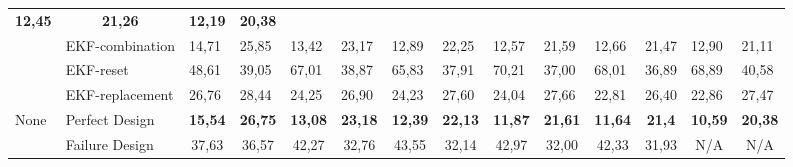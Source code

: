 \begin{table*}[]
\begin{tabular}{@{}llllllllllllll@{}}
		\multicolumn{1}{c|}{\textbf{12,45}} &
		\multicolumn{1}{c|}{\textbf{21,26}} &
		\multicolumn{1}{c|}{\textbf{12,19}} &
		\multicolumn{1}{c|}{\textbf{20,38}} \\ \cmidrule(l){2-14} 
		\multicolumn{1}{|l|}{} &
		\multicolumn{1}{l|}{EKF-combination} &
		\multicolumn{1}{l|}{14,71} &
		\multicolumn{1}{l|}{25,85} &
		\multicolumn{1}{l|}{13,42} &
		\multicolumn{1}{l|}{23,17} &
		\multicolumn{1}{l|}{12,89} &
		\multicolumn{1}{l|}{22,25} &
		\multicolumn{1}{l|}{12,57} &
		\multicolumn{1}{l|}{21,59} &
		\multicolumn{1}{l|}{12,66} &
		\multicolumn{1}{l|}{21,47} &
		\multicolumn{1}{l|}{12,90} &
		\multicolumn{1}{l|}{21,11} \\ \cmidrule(l){2-14} 
		\multicolumn{1}{|l|}{} &
		\multicolumn{1}{l|}{EKF-reset} &
		\multicolumn{1}{l|}{48,61} &
		\multicolumn{1}{l|}{39,05} &
		\multicolumn{1}{l|}{67,01} &
		\multicolumn{1}{l|}{38,87} &
		\multicolumn{1}{l|}{65,83} &
		\multicolumn{1}{l|}{37,91} &
		\multicolumn{1}{l|}{70,21} &
		\multicolumn{1}{l|}{37,00} &
		\multicolumn{1}{l|}{68,01} &
		\multicolumn{1}{l|}{36,89} &
		\multicolumn{1}{l|}{68,89} &
		\multicolumn{1}{l|}{40,58} \\ \cmidrule(l){2-14} 
		\multicolumn{1}{|l|}{} &
		\multicolumn{1}{l|}{EKF-replacement} &
		\multicolumn{1}{l|}{26,76} &
		\multicolumn{1}{l|}{28,44} &
		\multicolumn{1}{l|}{24,25} &
		\multicolumn{1}{l|}{26,90} &
		\multicolumn{1}{l|}{24,23} &
		\multicolumn{1}{l|}{27,60} &
		\multicolumn{1}{l|}{24,04} &
		\multicolumn{1}{l|}{27,66} &
		\multicolumn{1}{l|}{22,81} &
		\multicolumn{1}{l|}{26,40} &
		\multicolumn{1}{l|}{22,86} &
		\multicolumn{1}{l|}{27,47} \\ \midrule
		\multicolumn{1}{|l|}{\multirow{2}{*}{None}} &
		\multicolumn{1}{l|}{Perfect Design} &
		\multicolumn{1}{c|}{\textbf{15,54}} &
		\multicolumn{1}{c|}{\textbf{26,75}} &
		\multicolumn{1}{c|}{\textbf{13,08}} &
		\multicolumn{1}{c|}{\textbf{23,18}} &
		\multicolumn{1}{c|}{\textbf{12,39}} &
		\multicolumn{1}{c|}{\textbf{22,13}} &
		\multicolumn{1}{c|}{\textbf{11,87}} &
		\multicolumn{1}{c|}{\textbf{21,61}} &
		\multicolumn{1}{c|}{\textbf{11,64}} &
		\multicolumn{1}{c|}{\textbf{21,4}} &
		\multicolumn{1}{c|}{\textbf{10,59}} &
		\multicolumn{1}{c|}{\textbf{20,38}} \\ \cmidrule(l){2-14} 
		\multicolumn{1}{|l|}{} &
		\multicolumn{1}{l|}{Failure Design} &
		\multicolumn{1}{c|}{37,63} &
		\multicolumn{1}{c|}{36,57} &
		\multicolumn{1}{c|}{42,27} &
		\multicolumn{1}{c|}{32,76} &
		\multicolumn{1}{c|}{43,55} &
		\multicolumn{1}{c|}{32,14} &
		\multicolumn{1}{c|}{42,97} &
		\multicolumn{1}{c|}{32,00} &
		\multicolumn{1}{c|}{42,33} &
		\multicolumn{1}{c|}{31,93} &
		\multicolumn{1}{c|}{N/A} &
		\multicolumn{1}{c|}{N/A} \\ \bottomrule
	\end{tabular}
\end{table*}

